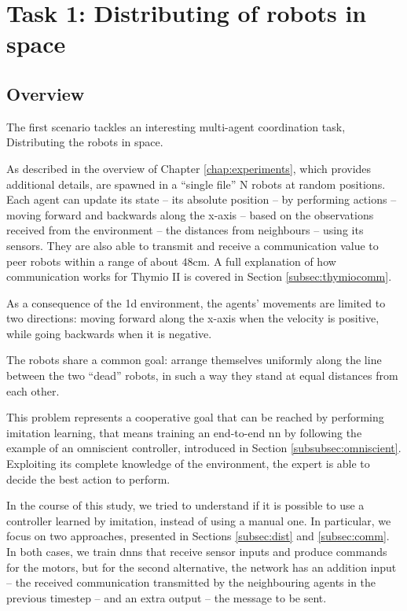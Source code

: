 \section{Task 1: Distributing of robots in space}
\label{sec:task1}

\subsection{Overview}
\label{subsec:desc1}

The first scenario tackles an interesting multi-agent coordination task, 
Distributing the robots in space.

As described in the overview of Chapter \ref{chap:experiments}, which provides 
additional details, are spawned in a ``single file'' N robots at random positions.
Each agent can update its state – its absolute position – by performing actions – 
moving forward and backwards along the x-axis – based on the observations 
received from the environment – the distances from neighbours – using its 
sensors. They are also able to transmit and receive a communication value to 
peer robots within a range of about $48$\gls{cm}. 
A full explanation of how communication works for Thymio II is covered in 
Section \ref{subsec:thymiocomm}.

As a consequence of the \gls{1d} environment, the agents' movements are 
limited to two directions: moving forward along the x-axis when the velocity is 
positive, while going backwards when it is negative. 

The robots share a common goal: arrange themselves uniformly along the 
line between the two ``dead'' robots, in such a way they stand at equal distances 
from each other.

This problem represents a cooperative goal that can be reached by performing 
imitation learning, that means training an end-to-end \gls{nn} by following 
the example of an omniscient controller, introduced in Section 
\ref{subsubsec:omniscient}.
Exploiting its complete knowledge of the environment, the expert is able to 
decide the best action to perform.

In the course of this study, we tried to understand if it is possible to use a 
controller learned by imitation, instead of using a manual one. In particular, we 
focus on two approaches, presented in Sections \ref{subsec:dist} and 
\ref{subsec:comm}.
In both cases, we train \glspl{dnn} that receive sensor inputs and produce 
commands for the motors, but for the second alternative, the network has an 
addition input – the received communication transmitted by the neighbouring 
agents in the previous timestep – and an extra output – the message to be sent.

